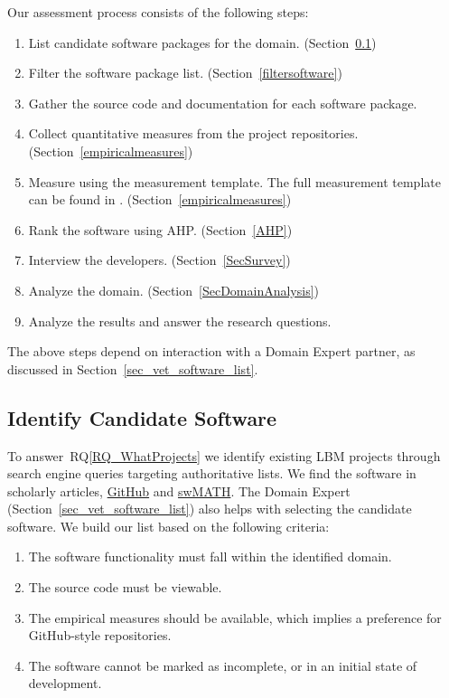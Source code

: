 \documentclass[final, 3p, times, authoryear]{elsarticle}
\newcommand{\rqref}[1]{RQ\ref{#1}}
\begin{document}
Our assessment process consists of the following steps: 

\begin{enumerate}
	\item List candidate software packages for the domain.
	(Section~\ref{identifysoftware})
	\item Filter the software package list. (Section~\ref{filtersoftware})
	\item Gather the source code and documentation for each software package.
	\item Collect quantitative measures from the project repositories.
	(Section~\ref{empiricalmeasures})
	\item Measure using the measurement template.  The full measurement template
	can be found in \citet{SmithEtAl2021}. %
	(Section~\ref{empiricalmeasures})
	\item Rank the software using AHP. (Section~\ref{AHP})
	\item Interview the developers. (Section~\ref{SecSurvey})
	\item Analyze the domain. (Section~\ref{SecDomainAnalysis})
	\item Analyze the results and answer the research questions.
\end{enumerate}

\noindent The above steps depend on interaction with a Domain Expert partner, as
discussed in Section~\ref{sec_vet_software_list}.

\subsection{Identify Candidate Software} \label{identifysoftware}

To answer~\rqref{RQ_WhatProjects} we identify existing LBM projects through
search engine queries targeting authoritative lists. We find the software in
scholarly articles, \href{https://github.com/} {GitHub} and
\href{https://swmath.org/} {swMATH}. The Domain Expert
(Section~\ref{sec_vet_software_list}) also helps with selecting the candidate
software.  We build our list based on the following criteria:

\begin{enumerate}
	\item The software functionality must fall within the identified domain.
	\item The source code must be viewable.
	\item The empirical measures should be available, which implies a preference
	for GitHub-style repositories.
	\item The software cannot be marked as incomplete, or in an initial state of
	development.
\end{enumerate}
\end{document}

